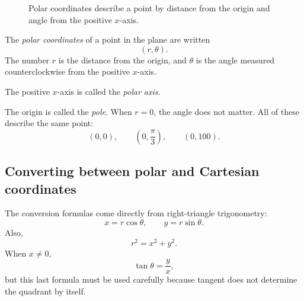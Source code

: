 \begin{figure}[h]
\centering
{}
\caption{Polar coordinates describe a point by distance from the origin and angle from
the positive \(x\)-axis.}
\end{figure}

\begin{definition}
The \emph{polar coordinates} of a point in the plane are written
\[
    (r,\theta).
\]
The number \(r\) is the distance from the origin, and \(\theta\) is the angle measured
counterclockwise from the positive \(x\)-axis.

The positive \(x\)-axis is called the \emph{polar axis}.
\end{definition}

The origin is called the \emph{pole}.  When \(r=0\), the angle does not matter.  All
of these describe the same point:
\[
    (0,0),\qquad
    \left(0,\frac{\pi}{3}\right),\qquad
    (0,100).
\]

\subsection{Converting between polar and Cartesian coordinates}

The conversion formulas come directly from right-triangle trigonometry:
\[
\boxed{
    x=r\cos\theta,\qquad y=r\sin\theta.
}
\]
Also,
\[
\boxed{
    r^2=x^2+y^2.
}
\]
When \(x\neq0\),
\[
    \tan\theta=\frac{y}{x},
\]
but this last formula must be used carefully because tangent does not determine the
quadrant by itself.

